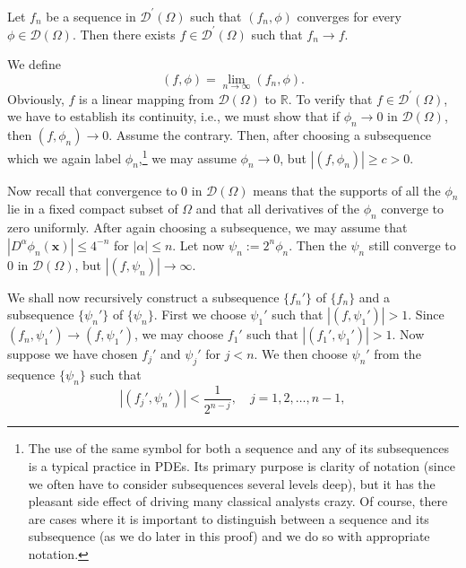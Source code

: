 \begin{Theorem}
\label{thm:distribution-sequential-completeness}
Let $f_n$ be a sequence in $\mathcal{D}^{\prime}(\Omega)$ such that $(f_n,\phi)$ converges for every $\phi\in\mathcal{D}(\Omega)$. Then there exists $f\in\mathcal{D}^{\prime}(\Omega)$ such that $f_n\to f$.
\end{Theorem}

\begin{Proof}
We define
\begin{equation}\label{eq:distribution-pointwise-pairing-limit}
(f,\phi)=\lim_{n\to\infty}(f_n,\phi).
\end{equation}
Obviously, $f$ is a linear mapping from $\mathcal{D}(\Omega)$ to $\mathbb{R}$. To verify that $f\in\mathcal{D}^{\prime}(\Omega)$, we have to establish its continuity, i.e., we must show that if $\phi_n\to0$ in $\mathcal{D}(\Omega)$, then $(f,\phi_n)\to0$. Assume the contrary. Then, after choosing a subsequence which we again label $\phi_n$,\footnote{The use of the same symbol for both a sequence and any of its subsequences is a typical practice in PDEs. Its primary purpose is clarity of notation (since we often have to consider subsequences several levels deep), but it has the pleasant side effect of driving many classical analysts crazy. Of course, there are cases where it is important to distinguish between a sequence and its subsequence (as we do later in this proof) and we do so with appropriate notation.} we may assume $\phi_n\to0$, but $|(f,\phi_n)|\geq c>0$.

Now recall that convergence to 0 in $\mathcal{D}(\Omega)$ means that the supports of all the $\phi_n$ lie in a fixed compact subset of $\Omega$ and that all derivatives of the $\phi_n$ converge to zero uniformly. After again choosing a subsequence, we may assume that $|D^\alpha\phi_n(\bm{x})|\leq4^{-n}$ for $|\alpha|\leq n$. Let now $\psi_n:=2^n\phi_n$. Then the $\psi_n$ still converge to 0 in $\mathcal{D}(\Omega)$, but $|(f,\psi_n)|\to\infty$.

We shall now recursively construct a subsequence $\{f_n'\}$ of $\{f_n\}$ and a subsequence $\{\psi_n'\}$ of $\{\psi_n\}$. First we choose $\psi_1'$ such that $|(f,\psi_1')|>1$. Since $(f_n,\psi_1')\to(f,\psi_1')$, we may choose $f_1'$ such that $|(f_1',\psi_1')|>1$. Now suppose we have chosen $f_j'$ and $\psi_j'$ for $j<n$. We then choose $\psi_n'$ from the sequence $\{\psi_n\}$ such that
\begin{equation}\label{eq:distribution-completeness-small-earlier-pairings}
|(f_j',\psi_n')|<\dfrac1{2^{n-j}},\quad j=1,2,\ldots,n-1,
\end{equation}


\end{Proof}
